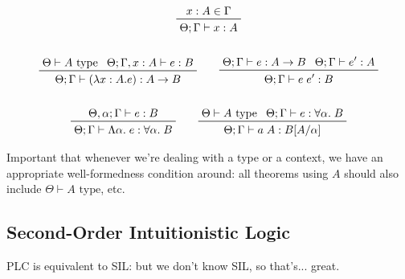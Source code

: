 \documentclass[a4paper,11pt]{article}
\begin{document}
{{        \begin{gather*}
        \prftree[r]{}
        {x:A \in \Gamma}
        {\Theta;\Gamma\vdash x:A}
        \\
        \\
        \prftree[r]{}
        {\Theta\vdash A\text{ type}}
        {\Theta;\Gamma,x:A\vdash e : B}
        {\Theta;\Gamma\vdash (\lambda x:A.e) : A \rightarrow B}
        \qquad
        \prftree[r]{}
        {\Theta;\Gamma\vdash e : A \rightarrow B}
        {\Theta;\Gamma\vdash e' : A}
        {\Theta;\Gamma\vdash e\;e' : B}
        \\
        \\
        \prftree[r]{}
        {\Theta,\alpha;\Gamma\vdash e : B}
        {\Theta;\Gamma\vdash \Lambda\alpha.\;e : \forall\alpha.\;B}
        \qquad
        \prftree[r]{}
        {\Theta\vdash A\text{ type}}
        {\Theta;\Gamma\vdash e : \forall\alpha.\;B}
        {\Theta;\Gamma\vdash a\;A : B[A/\alpha]}
        \end{gather*}

        Important that whenever we're dealing with a type or a context, we have an appropriate well-formedness condition
        around: all theorems using \(A\) should also include \(\Theta\vdash A\text{ type}\), etc.

        \subsection*{Second-Order Intuitionistic Logic}
        {
            PLC is equivalent to SIL: but we don't know SIL, so that's... great.
        }
    }
}
\end{document}
